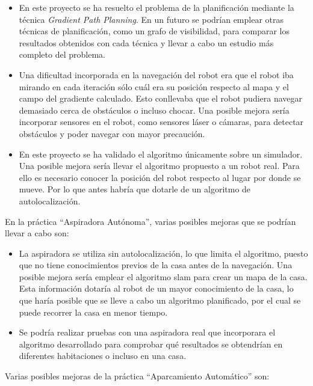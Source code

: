 \begin{itemize}
\item En este proyecto se ha resuelto el problema de la planificación mediante la técnica \textit{Gradient Path Planning}. En un futuro se podrían emplear otras técnicas de planificación, como un grafo de visibilidad, para comparar los resultados obtenidos con cada técnica y llevar a cabo un estudio más completo del problema.
\item Una dificultad incorporada en la navegación del robot era que el robot iba mirando en cada iteración sólo cuál era su posición respecto al mapa y el campo del gradiente calculado. Esto conllevaba que el robot pudiera navegar demasiado cerca de obstáculos o incluso chocar. Una posible mejora sería incorporar sensores en el robot, como sensores láser o cámaras, para detectar obstáculos y poder navegar con mayor precaución.
\item En este proyecto se ha validado el algoritmo únicamente sobre un simulador. Una posible mejora sería llevar el algoritmo propuesto a un robot real. Para ello es necesario conocer la posición del robot respecto al lugar por donde se mueve. Por lo que antes habría que dotarle de un algoritmo de autolocalización.
\end{itemize}

En la práctica ``Aspiradora Autónoma'', varias posibles mejoras que se podrían llevar a cabo son:

\begin{itemize}
\item La aspiradora se utiliza sin autolocalización, lo que limita el algoritmo, puesto que no tiene conocimientos previos de la casa antes de la navegación. Una posible mejora sería emplear el algoritmo \acrshort{slam} para crear un mapa de la casa. Esta información dotaría al robot de un mayor conocimiento de la casa, lo que haría posible que se lleve a cabo un algoritmo planificado, por el cual se puede recorrer la casa en menor tiempo.\\
\item Se podría realizar pruebas con una aspiradora real que incorporara el algoritmo desarrollado para comprobar qué resultados se obtendrían en diferentes habitaciones o incluso en una casa.
\end{itemize}

Varias posibles mejoras de la práctica ``Aparcamiento Automático'' son:

